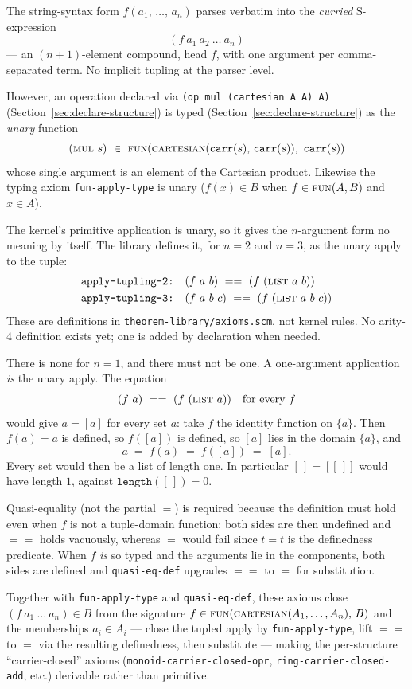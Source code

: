\begin{remark}
\label{sec:curried-tupled-apply}
The string-syntax form $f(a_1,\,\ldots,\,a_n)$ parses verbatim into the
\emph{curried} S-expression
\[
  (f\ a_1\ a_2\ \ldots\ a_n)
\]
— an $(n+1)$-element compound, head $f$, with one argument per
comma-separated term.  No implicit tupling at the parser level.

However, an operation declared via
\texttt{(op mul (cartesian A A) A)} (Section~\ref{sec:declare-structure})
is typed (Section~\ref{sec:declare-structure}) as the \emph{unary} function
\[
  (\textsc{mul}\ s)\ \in\ \textsc{fun}(\textsc{cartesian}(\mathtt{carr}(s),\,\mathtt{carr}(s)),\ \mathtt{carr}(s))
\]
whose single argument is an element of the Cartesian product.
Likewise the typing axiom \texttt{fun-apply-type} is unary
($f(x) \in B$ when $f \in \textsc{fun}(A,B)$ and $x \in A$).

The kernel's primitive application is unary, so it gives the
$n$-argument form no meaning by itself.  The library defines it, for
$n = 2$ and $n = 3$, as the unary apply to the tuple:
\begin{align*}
  \texttt{apply-tupling-2:}\quad & (f\ a\ b)\ \mathrel{==}\ (f\ (\textsc{list}\ a\ b))\\
  \texttt{apply-tupling-3:}\quad & (f\ a\ b\ c)\ \mathrel{==}\ (f\ (\textsc{list}\ a\ b\ c))
\end{align*}
These are definitions in \texttt{theorem-library/axioms.scm}, not
kernel rules.  No arity-4 definition exists yet; one is added by
declaration when needed.

There is none for $n = 1$, and there must not be one.  A
one-argument application \emph{is} the unary apply.  The equation
\[
  (f\ a)\ \mathrel{==}\ (f\ (\textsc{list}\ a)) \quad\text{for every } f
\]
would give $a = [a]$ for every set $a$: take $f$ the identity
function on $\{a\}$.  Then $f(a) = a$ is defined, so $f([a])$ is
defined, so $[a]$ lies in the domain $\{a\}$, and
\[
  a \;=\; f(a) \;=\; f([a]) \;=\; [a].
\]
Every set would then be a list of length one.  In particular
$[\,] = [[\,]]$ would have length $1$, against
$\mathtt{length}([\,]) = 0$.

Quasi-equality (not the partial $=$) is required because the
definition must hold even when $f$ is not a tuple-domain function:
both sides are then undefined and $\mathrel{==}$ holds vacuously,
whereas $=$ would fail since $t=t$ is the definedness predicate.
When $f$ \emph{is} so typed and the arguments lie in the components,
both sides are defined and \texttt{quasi-eq-def} upgrades
$\mathrel{==}$ to $=$ for substitution.

Together with
\texttt{fun-apply-type} and \texttt{quasi-eq-def}, these axioms
close $(f\ a_1\ \ldots\ a_n) \in B$ from the signature
$f \in \textsc{fun}(\textsc{cartesian}(A_1,\ldots,A_n),\,B)$ and the
memberships $a_i \in A_i$ — close the tupled apply by
\texttt{fun-apply-type}, lift $\mathrel{==}$ to $=$ via the
resulting definedness, then substitute — making the per-structure
``carrier-closed'' axioms (\texttt{monoid-carrier-closed-opr},
\texttt{ring-carrier-closed-add}, etc.) derivable rather than
primitive.
\end{remark}

